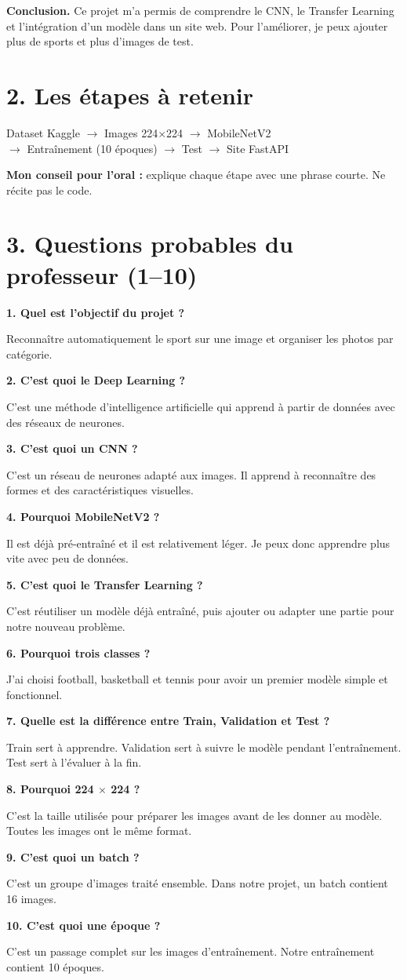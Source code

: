 \documentclass[10pt,a4paper]{article}
\newcommand{\question}[2]{\noindent\textbf{\color{vert}#1}\par #2\par\vspace{4pt}}
\begin{document}
\textbf{Conclusion.} Ce projet m'a permis de comprendre le CNN, le Transfer Learning et l'intégration d'un modèle dans un site web. Pour l'améliorer, je peux ajouter plus de sports et plus d'images de test.

\section{2. Les étapes à retenir}
\begin{center}
\small\color{gris}
Dataset Kaggle $\longrightarrow$ Images 224$\times$224 $\longrightarrow$ MobileNetV2\\[3pt]
$\longrightarrow$ Entraînement (10 époques) $\longrightarrow$ Test $\longrightarrow$ Site FastAPI
\end{center}
\textbf{Mon conseil pour l'oral :} explique chaque étape avec une phrase courte. Ne récite pas le code.

\newpage
\section{3. Questions probables du professeur (1--10)}
\question{1. Quel est l'objectif du projet ?}{Reconnaître automatiquement le sport sur une image et organiser les photos par catégorie.}
\question{2. C'est quoi le Deep Learning ?}{C'est une méthode d'intelligence artificielle qui apprend à partir de données avec des réseaux de neurones.}
\question{3. C'est quoi un CNN ?}{C'est un réseau de neurones adapté aux images. Il apprend à reconnaître des formes et des caractéristiques visuelles.}
\question{4. Pourquoi MobileNetV2 ?}{Il est déjà pré-entraîné et il est relativement léger. Je peux donc apprendre plus vite avec peu de données.}
\question{5. C'est quoi le Transfer Learning ?}{C'est réutiliser un modèle déjà entraîné, puis ajouter ou adapter une partie pour notre nouveau problème.}
\question{6. Pourquoi trois classes ?}{J'ai choisi football, basketball et tennis pour avoir un premier modèle simple et fonctionnel.}
\question{7. Quelle est la différence entre Train, Validation et Test ?}{Train sert à apprendre. Validation sert à suivre le modèle pendant l'entraînement. Test sert à l'évaluer à la fin.}
\question{8. Pourquoi 224 $\times$ 224 ?}{C'est la taille utilisée pour préparer les images avant de les donner au modèle. Toutes les images ont le même format.}
\question{9. C'est quoi un batch ?}{C'est un groupe d'images traité ensemble. Dans notre projet, un batch contient 16 images.}
\question{10. C'est quoi une époque ?}{C'est un passage complet sur les images d'entraînement. Notre entraînement contient 10 époques.}
\end{document}
